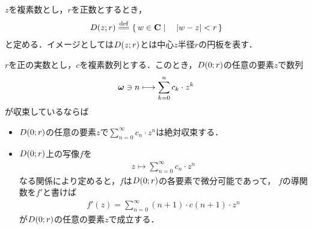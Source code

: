 	$z$を複素数とし，$r$を正数とするとき，
	\begin{align}
		\disc{z}{r} \defeq \Set{w \in \C}{|w - z| < r}
	\end{align}
	と定める．イメージとしては$D(z;r)$とは中心$z$半径$r$の円板を表す．
	
	\begin{screen}
		\begin{thm}[級数で表される関数は微分可能]
		\label{thm:series_expanded_then_differentiable}
			$r$を正の実数とし，$c$を複素数列とする．このとき，$D(0;r)$の任意の要素$z$で数列
			\begin{align}
				{\boldsymbol \omega} \ni n \longmapsto \sum_{k=0}^{n} c_{k} \cdot z^{k}
			\end{align}
			が収束しているならば
			\begin{itemize}
				\item $D(0;r)$の任意の要素$z$で$\sum_{n=0}^{\infty} c_{n} \cdot z^{n}$は絶対収束する．
				\item $D(0;r)$上の写像$f$を
					\begin{align}
						z \longmapsto \sum_{n=0}^{\infty} c_{n} \cdot z^{n}
					\end{align}
					なる関係により定めると，$f$は$D(0;r)$の各要素で微分可能であって，
					$f$の導関数を$f'$と書けば
					\begin{align}
						f'(z) = \sum_{n=0}^{\infty} (n+1) \cdot c(n+1) \cdot z^{n}
					\end{align}
					が$D(0;r)$の任意の要素$z$で成立する．
			\end{itemize}
		\end{thm}
	\end{screen}
	
